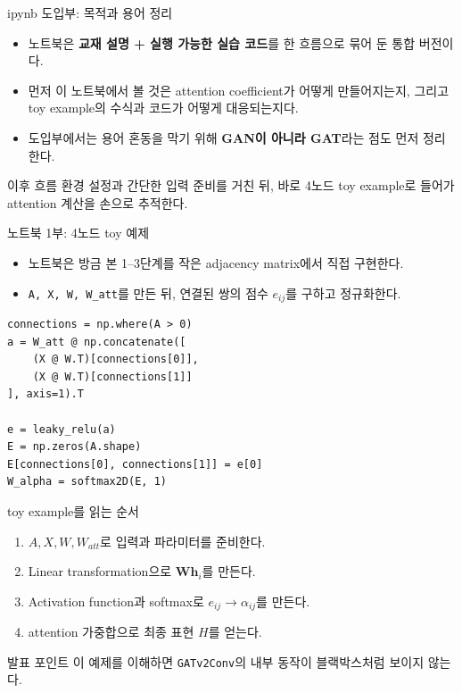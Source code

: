 \begin{frame}{ipynb 도입부: 목적과 용어 정리}
\begin{itemize}
  \item 노트북은 \textbf{교재 설명 + 실행 가능한 실습 코드}를 한 흐름으로 묶어 둔 통합 버전이다.
  \item 먼저 이 노트북에서 볼 것은 attention coefficient가 어떻게 만들어지는지, 그리고 toy example의 수식과 코드가 어떻게 대응되는지다.
  \item 도입부에서는 용어 혼동을 막기 위해 \textbf{GAN이 아니라 GAT}라는 점도 먼저 정리한다.
\end{itemize}
\vspace{0.3em}
\begin{block}{이후 흐름}
환경 설정과 간단한 입력 준비를 거친 뒤, 바로 4노드 toy example로 들어가 attention 계산을 손으로 추적한다.
\end{block}
\end{frame}

\begin{frame}[fragile]{노트북 1부: 4노드 toy 예제}
\begin{itemize}
  \item 노트북은 방금 본 1--3단계를 작은 adjacency matrix에서 직접 구현한다.
  \item \texttt{A, X, W, W\_att}를 만든 뒤, 연결된 쌍의 점수 $e_{ij}$를 구하고 정규화한다.
\end{itemize}
\vspace{0.3em}
\begin{lstlisting}
connections = np.where(A > 0)
a = W_att @ np.concatenate([
    (X @ W.T)[connections[0]],
    (X @ W.T)[connections[1]]
], axis=1).T

e = leaky_relu(a)
E = np.zeros(A.shape)
E[connections[0], connections[1]] = e[0]
W_alpha = softmax2D(E, 1)
\end{lstlisting}
\end{frame}

\begin{frame}{toy example를 읽는 순서}
\begin{enumerate}
  \item $A, X, W, W_{att}$로 입력과 파라미터를 준비한다.
  \item Linear transformation으로 $\mathbf{W}\mathbf{h}_i$를 만든다.
  \item Activation function과 softmax로 $e_{ij}\rightarrow\alpha_{ij}$를 만든다.
  \item attention 가중합으로 최종 표현 $H$를 얻는다.
\end{enumerate}
\vspace{0.3em}
\begin{block}{발표 포인트}
이 예제를 이해하면 \texttt{GATv2Conv}의 내부 동작이 블랙박스처럼 보이지 않는다.
\end{block}
\end{frame}

